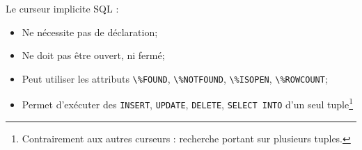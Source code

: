 \documentclass[10pt]{beamer}
\begin{document}
\begin{frame}{\secname}
    Le curseur implicite SQL :
    \begin{itemize}
        \item Ne nécessite pas de déclaration;
        \item Ne doit pas être ouvert, ni fermé;
        \item Peut utiliser les attributs \lstinline[language=plsql]!\%FOUND!, \lstinline[language=plsql]!\%NOTFOUND!, \lstinline[language=plsql]!\%ISOPEN!, \lstinline[language=plsql]!\%ROWCOUNT!;
        \item Permet d'exécuter des \lstinline[language=plsql]!INSERT!, \lstinline[language=plsql]!UPDATE!, \lstinline[language=plsql]!DELETE!, \lstinline[language=plsql]!SELECT INTO! d'un seul tuple\footnote{Contrairement aux autres curseurs : recherche portant sur plusieurs tuples.}
    \end{itemize}
\end{frame}

\begin{frame}{\secname}
    
\end{frame}

\begin{frame}[allowframebreaks]{\secname}
    
\end{frame}

\end{document}

